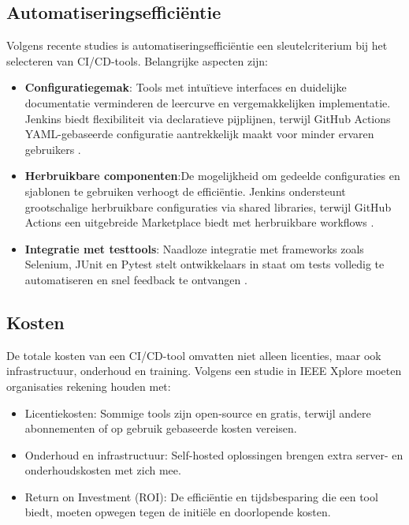 \subsection{Automatiseringsefficiëntie}

Volgens recente studies \autocite{forsgren2018, githubdocs2023actions} is automatiseringsefficiëntie een sleutelcriterium bij het selecteren van CI/CD-tools. Belangrijke aspecten zijn:
\begin{itemize}
    \item \textbf{Configuratiegemak}: Tools met intuïtieve interfaces en duidelijke documentatie verminderen de leercurve en vergemakkelijken implementatie. Jenkins biedt flexibiliteit via declaratieve pijplijnen, terwijl GitHub Actions YAML-gebaseerde configuratie aantrekkelijk maakt voor minder ervaren gebruikers \autocite{forsgren2018}.
    \item \textbf{Herbruikbare componenten}:De mogelijkheid om gedeelde configuraties en sjablonen te gebruiken verhoogt de efficiëntie. Jenkins ondersteunt grootschalige herbruikbare configuraties via shared libraries, terwijl GitHub Actions een uitgebreide Marketplace biedt met herbruikbare workflows \autocite{githubdocs2023marketplace}.
    \item \textbf{Integratie met testtools}: Naadloze integratie met frameworks zoals Selenium, JUnit en Pytest stelt ontwikkelaars in staat om tests volledig te automatiseren en snel feedback te ontvangen \autocite{smith2023automation}.
\end{itemize}

\subsection{Kosten}
De totale kosten van een CI/CD-tool omvatten niet alleen licenties, maar ook infrastructuur, onderhoud en training. Volgens een studie in IEEE Xplore \autocite{ieee2023costbenefit} moeten organisaties rekening houden met: \begin{itemize} \item Licentiekosten: Sommige tools zijn open-source en gratis, terwijl andere abonnementen of op gebruik gebaseerde kosten vereisen. \item Onderhoud en infrastructuur: Self-hosted oplossingen brengen extra server- en onderhoudskosten met zich mee. \item Return on Investment (ROI): De efficiëntie en tijdsbesparing die een tool biedt, moeten opwegen tegen de initiële en doorlopende kosten. \end{itemize}



